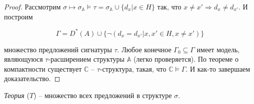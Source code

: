 \begin{proof}
    Рассмотрим $\sigma \mapsto \sigma_{\mathbb{A}} \models \tau = \sigma_{\mathbb{A}} \cup \{d_x | x \in H\}$ так, что $x \neq x' \Rightarrow d_x \neq d_{x'}$. И построим  

    \[ 
        \Gamma = D^*(A) \cup \{\neg(d_x = d_{x'}| x, x' \in H, x \neq x')\} 
    \]

    множество предложений сигнатуры $\tau$. Любое конечное $\Gamma_0 \subseteq \Gamma$ имеет модель, являющуюся $\tau$-расширением структуры $\mathbb{A}$ (легко проверяется). По теореме о компактности существует $\mathbb{C}$ -- $\tau$-структура, такая, что $\mathbb{C} \models \Gamma$. И как-то завершаем доказательство.
\end{proof}

\begin{definition}
    \textit{Теория} ($T$) -- множество всех предложений в структуре $\sigma$.
\end{definition}